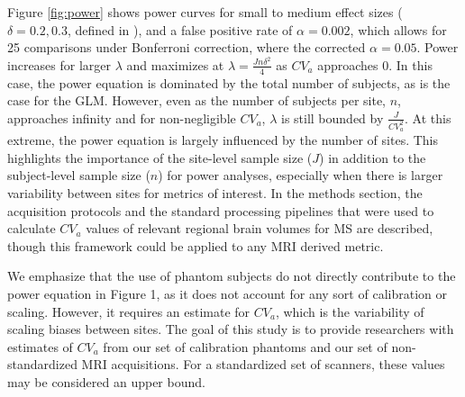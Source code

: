 Figure \ref{fig:power} shows power curves for small to medium effect sizes ($\delta = 0.2, 0.3$, defined in \cite{Raudenbush2000}), and a false positive rate of $\alpha = 0.002$, which allows for 25 comparisons under Bonferroni correction, where the corrected $\alpha = 0.05$. Power increases for larger $\lambda$  and maximizes at $\lambda = \frac{Jn\delta^2}{4}$ as $CV_a$ approaches 0. In this case, the power equation is dominated by the total number of subjects, as is the case for the GLM. However, even as the number of subjects per site, $n$, approaches infinity and for non-negligible $CV_a$, $\lambda$ is still bounded by $\frac{J}{CV_a^2}$. At this extreme, the  power equation is largely influenced by the number of sites. This highlights the importance of the site-level sample size ($J$) in addition to the subject-level sample size ($n$) for power analyses, especially when there is larger variability between sites for metrics of interest. In the methods section, the acquisition protocols and the standard processing pipelines that were used to calculate $CV_a$ values of relevant regional brain volumes for MS are described, though this framework could be applied to any MRI derived metric.

We emphasize that the use of phantom subjects do not directly contribute to the power equation in Figure 1, as it does not account for any sort of calibration or scaling. However, it requires an estimate for $CV_a$, which is the variability of scaling biases between sites. The goal of this study is to provide researchers with estimates of $CV_a$ from our set of calibration phantoms and our set of non-standardized MRI acquisitions. For a standardized set of scanners, these values may be considered an upper bound. 